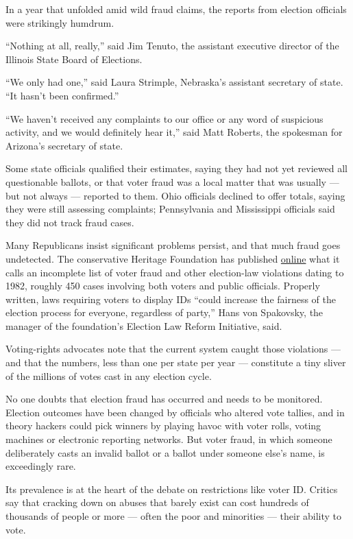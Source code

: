 In a year that unfolded amid wild fraud claims, the reports from
election officials were strikingly humdrum.

``Nothing at all, really,'' said Jim Tenuto, the assistant executive
director of the Illinois State Board of Elections.

``We only had one,'' said Laura Strimple, Nebraska's assistant secretary
of state. ``It hasn't been confirmed.''

``We haven't received any complaints to our office or any word of
suspicious activity, and we would definitely hear it,'' said Matt
Roberts, the spokesman for Arizona's secretary of state.

Some state officials qualified their estimates, saying they had not yet
reviewed all questionable ballots, or that voter fraud was a local
matter that was usually --- but not always --- reported to them. Ohio
officials declined to offer totals, saying they were still assessing
complaints; Pennsylvania and Mississippi officials said they did not
track fraud cases.

Many Republicans insist significant problems persist, and that much
fraud goes undetected. The conservative Heritage Foundation has
published \href{http://bit.ly/2ekpokZ}{online} what it calls an
incomplete list of voter fraud and other election-law violations dating
to 1982, roughly 450 cases involving both voters and public officials.
Properly written, laws requiring voters to display IDs ``could increase
the fairness of the election process for everyone, regardless of
party,'' Hans von Spakovsky, the manager of the foundation's Election
Law Reform Initiative, said.

Voting-rights advocates note that the current system caught those
violations --- and that the numbers, less than one per state per year
--- constitute a tiny sliver of the millions of votes cast in any
election cycle.

No one doubts that election fraud has occurred and needs to be
monitored. Election outcomes have been changed by officials who altered
vote tallies, and in theory hackers could pick winners by playing havoc
with voter rolls, voting machines or electronic reporting networks. But
voter fraud, in which someone deliberately casts an invalid ballot or a
ballot under someone else's name, is exceedingly rare.

Its prevalence is at the heart of the debate on restrictions like voter
ID. Critics say that cracking down on abuses that barely exist can cost
hundreds of thousands of people or more --- often the poor and
minorities --- their ability to vote.


